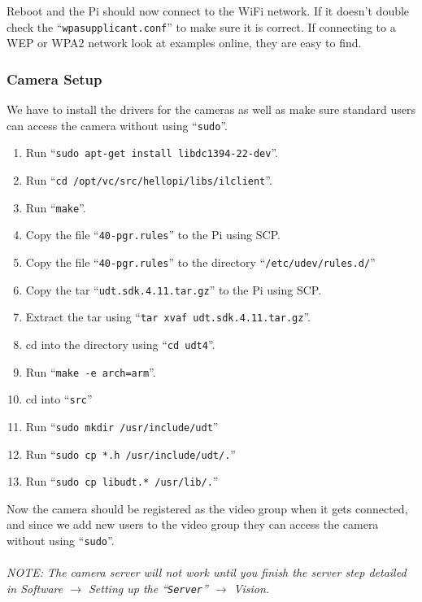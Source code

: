 \documentclass{article}
\begin{document}
Reboot and the Pi should now connect to the WiFi network. If it doesn't double check the ``{\tt wpa\textunderscore supplicant.conf}'' to make sure it is correct. If connecting to a WEP or WPA2 network look at examples online, they are easy to find.

\subsubsection{Camera Setup}
We have to install the drivers for the cameras as well as make sure standard users can access the camera without using ``{\tt sudo}''.

\begin{enumerate}
    \item Run ``{\tt sudo apt-get install libdc1394-22-dev}''.
    \item Run ``{\tt cd /opt/vc/src/hello\textunderscore pi/libs/ilclient}''.
    \item Run ``{\tt make}''.
    \item Copy the file ``{\tt 40-pgr.rules}'' to the Pi using SCP.
    \item Copy the file ``{\tt 40-pgr.rules}'' to the directory ``{\tt /etc/udev/rules.d/}''
    \item Copy the tar ``{\tt udt.sdk.4.11.tar.gz}'' to the Pi using SCP.
    \item Extract the tar using ``{\tt tar xvaf udt.sdk.4.11.tar.gz}''.
    \item cd into the directory using ``{\tt cd udt4}''.
    \item Run ``{\tt make -e arch=arm}''.
    \item cd into ``{\tt src}''
    \item Run ``{\tt sudo mkdir /usr/include/udt}''
    \item Run ``{\tt sudo cp *.h /usr/include/udt/.}''
    \item Run ``{\tt sudo cp libudt.* /usr/lib/.}''
\end{enumerate}
Now the camera should be registered as the video group when it gets connected, and since we add new users to the video group they can access the camera without using ``{\tt sudo}''.
\\
\\
\emph{NOTE: The camera server will not work until you finish the server step detailed in Software $\rightarrow$ Setting up the ``{\tt Server}'' $\rightarrow$ Vision.}
\end{document}
